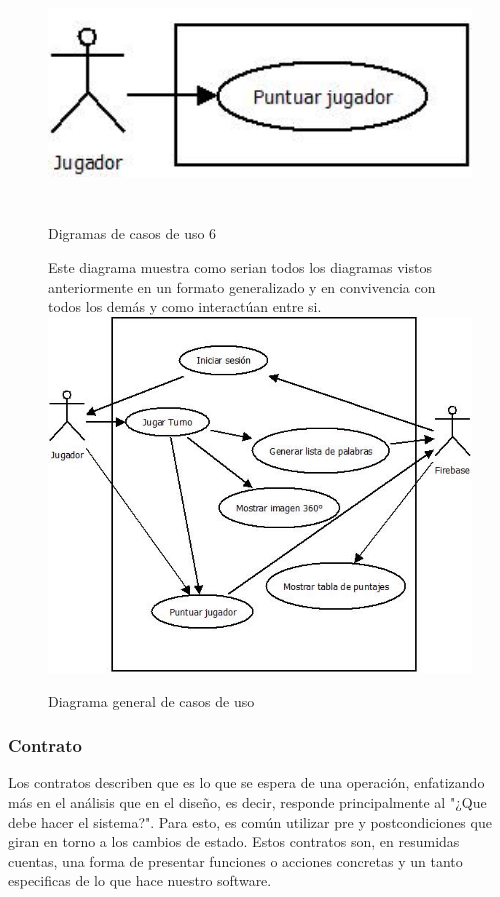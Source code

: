 \begin{figure}[H]
	\centering
	{\includegraphics[width=12cm, height=6cm]{imgs/DiagramaCasoUso6.png}}
 	\caption{Digramas de casos de uso 6}
\end{figure}

\begin{figure}[H]
\centering
	Este diagrama muestra como serian todos los diagramas vistos anteriormente en un formato generalizado y en convivencia con todos los demás y como interactúan entre si.\\
	\bigskip\bigskip
   \includegraphics[scale=0.7]{imgs/DCUs.jpeg}
   \begin{center}
   \caption{Diagrama general de casos de uso}
   \end{center}
\end{figure}

\subsubsection{Contrato}
Los contratos describen que es lo que se espera de una operación, enfatizando más en el análisis que en el diseño, es decir, responde principalmente al "¿Que debe hacer el sistema?". Para esto, es común utilizar pre y postcondiciones que giran en torno a los cambios de estado.
Estos contratos son, en resumidas cuentas, una forma de presentar funciones o acciones concretas y un tanto especificas de lo que hace nuestro software.

